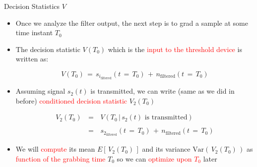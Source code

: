 \documentclass{Beamer}
\begin{document}
\begin{frame}[t]{Decision Statistics $V$}

\begin{itemize}

\item Once we analyze the filter output, the next step is to grad a sample at some time instant $T_0$

\item The decision statistic $V(T_0)$ which is the \textcolor{red}{input to the threshold device} is written as:

\begin{equation}
V(T_0) \, = \, s_{i_{\text{filtered}}}(t \, = \, T_0) \, + \, n_{\text{filtered}}(t \, = \, T_0)
\end{equation}

\item Assuming signal $s_2(t)$ is transmitted, we can write (same as we did in before) \textcolor{red}{conditioned decision statistic} $V_2(T_0)$

\begin{equation}
\begin{array}{rcl}
V_2(T_0) \, &=& \, V(T_0 \, | \, s_2(t) \text{ is transmitted}) \\ \\
 &=& \, s_{2_{\text{filtered}}}(t \, = \, T_0) \, + \, n_{\text{filtered}}(t \, = \, T_0)
\end{array}
\end{equation}

\item We will \textcolor{red}{compute} its mean $ E[\,V_2(T_0)  \,]$ and its variance $\text{Var} ( \, V_2(T_0)  \, )$ as \textcolor{red}{function of the grabbing time} $T_0$ so we can \textcolor{red}{optimize upon $T_0$} later

\end{itemize}

\end{frame}
\end{document}
